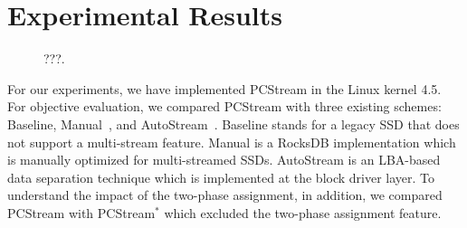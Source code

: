\vspace{-10pt}
\section{Experimental Results}
\vspace{-5pt}

\begin{figure}[t]
	\centering
	\vspace{-10pt}
	\caption{???.}
	\label{fig:exp}
	\vspace{-15pt}
\end{figure}

For our experiments, we have implemented \textsf{PCStream} in the Linux kernel
4.5.  For objective evaluation, we compared \textsf{PCStream} with three
existing schemes: \textsf{Baseline}, \textsf{Manual}~\cite{MultiStream}, and
\textsf{AutoStream}~\cite{AutoStream}.  \textsf{Baseline} stands for a legacy
SSD that does not support a multi-stream feature. \textsf{Manual} is a RocksDB
implementation which is manually optimized for multi-streamed SSDs.
\textsf{AutoStream} is an LBA-based data separation technique which is
implemented at the block driver layer. To understand the impact of the
two-phase assignment, in addition, we compared \textsf{PCStream} with
\textsf{PCStream$^{*}$} which excluded the two-phase assignment feature.

